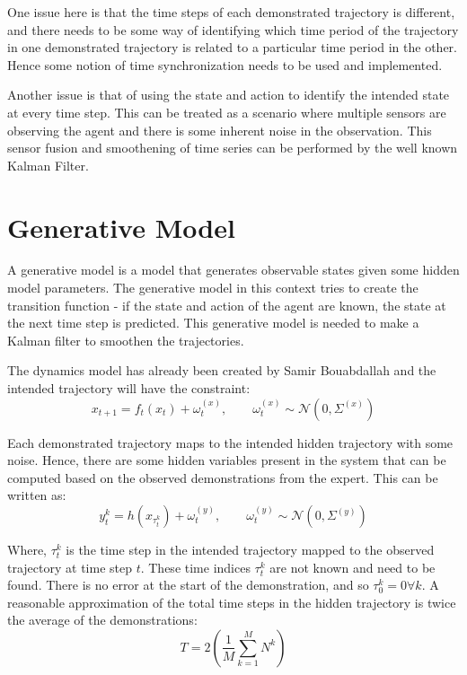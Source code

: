 \documentclass[hidelinks,BTech]{iitmdiss}
\begin{document}
One issue here is that the time steps of each demonstrated trajectory is different, and there needs to be some way of identifying which time period of the trajectory in one demonstrated trajectory is related to a particular time period in the other. Hence some notion of time synchronization needs to be used and implemented.

Another issue is that of using the state and action to identify the intended state at every time step. This can be treated as a scenario where multiple sensors are observing the agent and there is some inherent noise in the observation. This sensor fusion and smoothening of time series can be performed by the well known Kalman Filter.

\section{Generative Model}

A generative model is a model that generates observable states given some hidden model parameters. The generative model in this context tries to create the transition function - if the state and action of the agent are known, the state at the next time step is predicted. This generative model is needed to make a Kalman filter to smoothen the trajectories.

The dynamics model has already been created by Samir Bouabdallah \cite{QuadrotorDynamics} and the intended trajectory will have the constraint:
\begin{equation}
  x_{t+1} = f_{t} (x_{t}) + {\omega}_{t}^{(x)}, \qquad \omega_t^{(x)} \sim \mathcal{N} (0, \Sigma^{(x)})
\end{equation}

Each demonstrated trajectory maps to the intended hidden trajectory with some noise. Hence, there are some hidden variables present in the system that can be computed based on the observed demonstrations from the expert. This can be written as:
\begin{equation}
  y_{t}^{k} = h(x_{\tau_t^k}) + {\omega}_{t}^{(y)}, \qquad \omega_t^{(y)} \sim \mathcal{N} (0, \Sigma^{(y)})
\end{equation}

Where, $\tau_t^k$ is the time step in the intended trajectory mapped to the observed trajectory at time step $t$. These time indices $\tau_t^k$ are not known and need to be found. There is no error at the start of the demonstration, and so $\tau_0^k = 0 \forall k$. A reasonable approximation of the total time steps in the hidden trajectory is twice the average of the demonstrations:
\begin{equation}
  T = 2 \left( \frac{1}{M} \sum_{k=1}^{M} N^k \right)
\end{equation}
\end{document}
